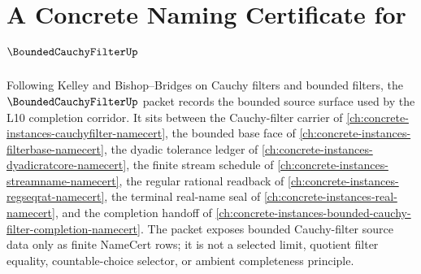 \chapter{A Concrete Naming Certificate for $\BoundedCauchyFilterUp$}
\label{ch:concrete-instances-bounded-cauchy-filter-namecert}

Following Kelley and Bishop--Bridges on Cauchy filters and bounded filters, the $\BoundedCauchyFilterUp$ packet records the bounded source surface used by the L10 completion corridor. It sits between the Cauchy-filter carrier of \autoref{ch:concrete-instances-cauchyfilter-namecert}, the bounded base face of \autoref{ch:concrete-instances-filterbase-namecert}, the dyadic tolerance ledger of \autoref{ch:concrete-instances-dyadicratcore-namecert}, the finite stream schedule of \autoref{ch:concrete-instances-streamname-namecert}, the regular rational readback of \autoref{ch:concrete-instances-regseqrat-namecert}, the terminal real-name seal of \autoref{ch:concrete-instances-real-namecert}, and the completion handoff of \autoref{ch:concrete-instances-bounded-cauchy-filter-completion-namecert}. The packet exposes bounded Cauchy-filter source data only as finite NameCert rows; it is not a selected limit, quotient filter equality, countable-choice selector, or ambient completeness principle.

